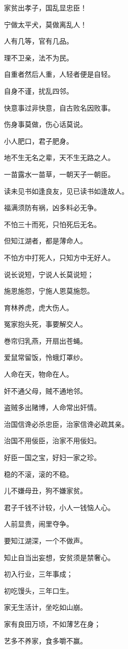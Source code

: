 \documentclass[12pt,oneside]{book}
\begin{document}
家贫出孝子，国乱显忠臣！

宁做太平犬，莫做离乱人！

人有几等，官有几品。

理不卫亲，法不为民。

自重者然后人重，人轻者便是自轻。

自身不谨，扰乱四邻。

快意事过非快意，自古败名因败事。

伤身事莫做，伤心话莫说。

小人肥口，君子肥身。

地不生无名之辈，天不生无路之人。

一苗露水一苗草，一朝天子一朝臣。

读未见书如逢良友，见已读书如逢故人。

福满须防有祸，凶多料必无争。

不怕三十而死，只怕死后无名。

但知江湖者，都是薄命人。

不怕方中打死人，只知方中无好人。

说长说短，宁说人长莫说短；

施恩施怨，宁施人恩莫施怨。

育林养虎，虎大伤人。

冤家抱头死，事要解交人。

巻帘归乳燕，开扇出苍蝇。

爱鼠常留饭，怜蛾灯罩纱。

人命在天，物命在人。

奸不通父母，贼不通地邻。

盗贼多出赌博，人命常出奸情。

治国信谗必杀忠臣，治家信谗必疏其亲。

治国不用佞臣，治家不用佞妇。

好臣一国之宝，好妇一家之珍。

稳的不滚，滚的不稳。

儿不嫌母丑，狗不嫌家贫。

君子千钱不计较，小人一钱恼人心。

人前显贵，闹里夺争。

要知江湖深，一个不做声。

知止自当出妄想，安贫须是禁奢心。

初入行业，三年事成；

初吃馒头，三年口生。

家无生活计，坐吃如山崩。

家有良田万顷，不如薄艺在身；

艺多不养家，食多嚼不赢。
\end{document}

